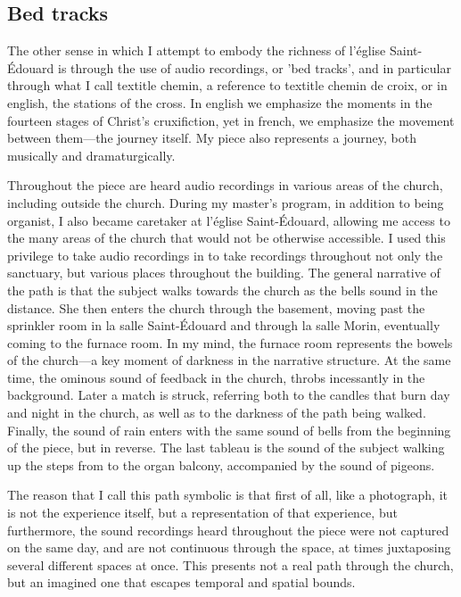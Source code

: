 \documentclass[12pt,twoside,maitrise]{dms_ks}
\theoremstyle{definition}
\begin{document}
{\subsection{Bed tracks}

The other sense in which I attempt to embody the richness of l'église Saint-Édouard is through the use of audio recordings, or 'bed tracks', and in particular through what I call textit{le chemin}, a reference to textit{le chemin de croix}, or in english, the stations of the cross. 
In english we emphasize the moments in the fourteen stages of Christ's cruxifiction, yet in french, we emphasize the movement between them---the journey itself. 
My piece also represents a journey, both musically and dramaturgically. 

Throughout the piece are heard audio recordings in various areas of the church, including outside the church. 
During my master's program, in addition to being organist, I also became caretaker at l'église Saint-Édouard, allowing me access to the many areas of the church that would not be otherwise accessible. 
I used this privilege to take audio recordings in to take recordings throughout not only the sanctuary, but various places throughout the building. 
The general narrative of the path is that the subject walks towards the church as the bells sound in the distance. 
She then enters the church through the basement, moving past the sprinkler room in la salle Saint-Édouard and through la salle Morin, eventually coming to the furnace room. 
In my mind, the furnace room represents the bowels of the church---a key moment of darkness in the narrative structure. 
At the same time, the ominous sound of feedback in the church, throbs incessantly in the background. 
Later a match is struck, referring both to the candles that burn day and night in the church, as well as to the darkness of the path being walked. 
Finally, the sound of rain enters with the same sound of bells from the beginning of the piece, but in reverse. 
The last tableau is the sound of the subject walking up the steps from to the organ balcony, accompanied by the sound of pigeons.

The reason that I call this path symbolic is that first of all, like a photograph, it is not the experience itself, but a representation of that experience, but furthermore, the sound recordings heard throughout the piece were not captured on the same day, and are not continuous through the space, at times juxtaposing several different spaces at once. 
This presents not a real path through the church, but an imagined one that escapes temporal and spatial bounds.

}
\end{document}

